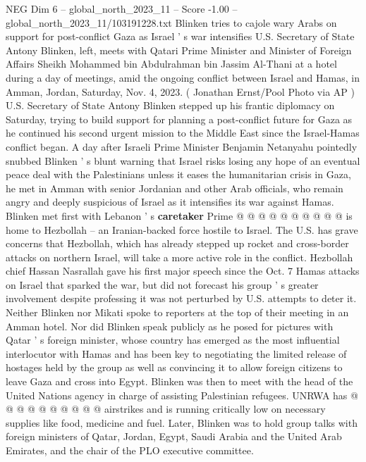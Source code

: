 \begin{textsample}{NEG Dim 6 – global\_north\_2023\_11 – Score -1.00 – global\_north\_2023\_11/103191228.txt}  \label{ex:f6_neg_204}
Blinken tries to cajole wary Arabs on support for post-conflict Gaza as Israel ' s war intensifies U.S.
Secretary of State Antony Blinken, left, meets with Qatari Prime Minister and Minister of Foreign Affairs Sheikh Mohammed bin Abdulrahman bin Jassim Al-Thani at a hotel during a day of meetings, amid the ongoing conflict between Israel and Hamas, in Amman, Jordan, Saturday, Nov. 4, 2023. ( Jonathan Ernst/Pool Photo via AP ) U.S.
Secretary of State Antony Blinken stepped up his frantic diplomacy on Saturday, trying to build support for planning a post-conflict future for Gaza as he continued his second urgent mission to the Middle East since the Israel-Hamas conflict began.
A day after Israeli Prime Minister Benjamin Netanyahu pointedly snubbed Blinken ' s blunt warning that Israel risks losing any hope of an eventual peace deal with the Palestinians unless it eases the humanitarian crisis in Gaza, he met in Amman with senior Jordanian and other Arab officials, who remain angry and deeply suspicious of Israel as it intensifies its war against Hamas.
Blinken met first with Lebanon ' s \textbf{caretaker} Prime @ @ @ @ @ @ @ @ @ @ is home to Hezbollah -- an Iranian-backed force hostile to Israel.
The U.S. has grave concerns that Hezbollah, which has already stepped up rocket and cross-border attacks on northern Israel, will take a more active role in the conflict.
Hezbollah chief Hassan Nasrallah gave his first major speech since the Oct. 7 Hamas attacks on Israel that sparked the war, but did not forecast his group ' s greater involvement despite professing it was not perturbed by U.S. attempts to deter it.
Neither Blinken nor Mikati spoke to reporters at the top of their meeting in an Amman hotel.
Nor did Blinken speak publicly as he posed for pictures with Qatar ' s foreign minister, whose country has emerged as the most influential interlocutor with Hamas and has been key to negotiating the limited release of hostages held by the group as well as convincing it to allow foreign citizens to leave Gaza and cross into Egypt.
Blinken was then to meet with the head of the United Nations agency in charge of assisting Palestinian refugees.
UNRWA has @ @ @ @ @ @ @ @ @ @ airstrikes and is running critically low on necessary supplies like food, medicine and fuel.
Later, Blinken was to hold group talks with foreign ministers of Qatar, Jordan, Egypt, Saudi Arabia and the United Arab Emirates, and the chair of the PLO executive committee.

\end{textsample}
